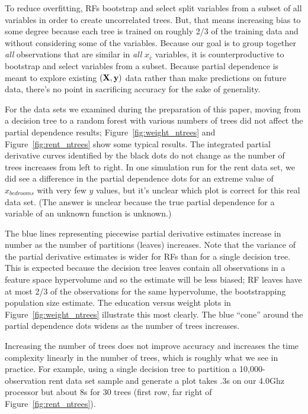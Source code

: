 \documentclass[12pt]{article}
\newcommand{\figref}[1]{Figure~\ref{#1}}
\newcommand{\xnc}{$x_{\overline{c}}$}
\begin{document}
To reduce overfitting, RFs bootstrap and select split variables from a subset of all variables in order to create uncorrelated trees. But, that means increasing bias to some degree because each tree is trained on roughly 2/3 of the training data and without considering some of the variables. Because our goal is to group together {\em all} observations that are similar in {\em all} \xnc{} variables, it is counterproductive to bootstrap and select variables from a subset. Because partial dependence is meant to explore existing $(\bf X, y)$ data rather than make predictions on future data, there's no point in sacrificing accuracy for the sake of generality. 

For the data sets we examined during the preparation of this paper, moving from a decision tree to a random forest with various numbers of trees did not affect the partial dependence results; \figref{fig:weight_ntrees} and \figref{fig:rent_ntrees} show some typical results. The integrated partial derivative curves identified by the black dots do not change as the number of trees increases from left to right.  In one simulation run for the rent data set, we did see a difference in the partial dependence dots for an extreme value of $x_{bedrooms}$ with very few $y$ values, but it's unclear which plot is correct for this real data set. (The answer is unclear because the true partial dependence for a variable of an unknown function is unknown.)

The blue lines representing piecewise partial derivative estimates increase in number as the number of partitions (leaves) increases.  Note that the variance of the partial derivative estimates is wider for RFs than for a single decision tree. This is expected because the decision tree leaves contain all observations in a feature space hypervolume and so the estimate will be less biased; RF leaves have at most 2/3 of the observations for the same hypervolume, the bootstrapping population size estimate. The education versus weight plots in \figref{fig:weight_ntrees} illustrate this most clearly. The blue ``cone'' around the partial dependence dots widens as the number of trees increases.  

Increasing the number of trees does not improve accuracy and increases the time complexity linearly in the number of trees, which is roughly what we see in practice.  For example, using a single decision tree to partition a 10,000-observation rent data set sample and generate a plot takes .3s on our 4.0Ghz processor but about 8s for 30 trees (first row, far right of \figref{fig:rent_ntrees}).
\end{document}
